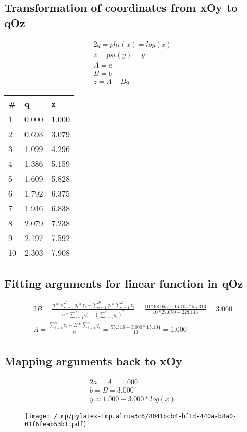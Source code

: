 \documentclass{article}%
\begin{document}
\subsection{Transformation of coordinates from xOy to qOz}%
\label{subsec:TransformationofcoordinatesfromxOytoqOz}%
\begin{alignat*}{2}%
q = phi(x) = log(x) \\%
z = psi(y) = y \\%
A = a \\%
B = b \\%
z = A + Bq%
\end{alignat*}

%
\begin{longtable}{l l l}%
\hline%
\#&q&z\\%
\hline%
\endhead%
1&0.000&1.000\\%
2&0.693&3.079\\%
3&1.099&4.296\\%
4&1.386&5.159\\%
5&1.609&5.828\\%
6&1.792&6.375\\%
7&1.946&6.838\\%
8&2.079&7.238\\%
9&2.197&7.592\\%
10&2.303&7.908\\%
\end{longtable}%
\subsection{Fitting arguments for linear function in qOz}%
\label{subsec:FittingargumentsforlinearfunctioninqOz}%
\begin{alignat*}{2}%
B
                    = \frac {n * \sum\limits_{i = 1}^n {q_i * z_i} - \sum\limits_{i = 1}^n {q_i} * \sum\limits_{i = 1}^n {z_i}}
                        {n * \sum\limits_{i = 1}^n {q_i^2} - (\sum\limits_{i = 1}^n {q_i}) ^ 2}
                    = \frac {10 * 98.055 - 15.104 * 55.313}
                        {10 * 27.650 - 228.143}
                    = 3.000 \\%
A
                    = \frac {\sum\limits_{i = 1}^n {z_i} - B * \sum\limits_{i = 1}^{n} {q_i}} n
                    = \frac {55.313 - 3.000 * 15.104} {10}
                    = 1.000 \\%
\end{alignat*}

%
\subsection{Mapping arguments back to xOy}%
\label{subsec:MappingargumentsbacktoxOy}%
\begin{alignat*}{2}%
a = A = 1.000 \\%
b = B = 3.000 \\%
y \approx1.000 + 3.000 * log(x)%
\end{alignat*}%


\begin{figure}[htbp]%
\centering%
\texttt{[image: /tmp/pylatex-tmp.alrua3c6/8041bcb4-bf1d-440a-b8a0-01f6feab53b1.pdf]}%
\end{figure}

%
\end{document}
